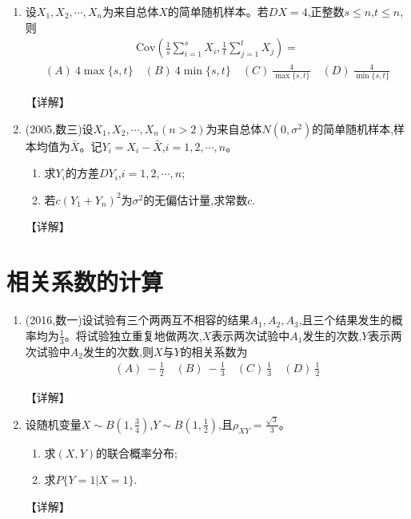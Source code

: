 \documentclass[12pt, a4paper, oneside, UTF8]{ctexbook}
\begin{document}
\begin{enumerate}[label=\arabic*.,start=11]
    \item  设$X_1,X_2,\cdots,X_n$为来自总体$X$的简单随机样本。若$DX=4$,正整数$s\leq n$,$t\leq n$,则
    \begin{align*}
        \text{Cov}\left(\frac{1}{s}\sum_{i=1}^s X_i,\frac{1}{t}\sum_{j=1}^t X_j\right)=
    \end{align*}
    \begin{align*}
        (A)\ 4\max\{s,t\} \quad (B)\ 4\min\{s,t\} \quad (C)\ \frac{4}{\max\{s,t\}} \quad (D)\ \frac{4}{\min\{s,t\}}
    \end{align*}
    
    \begin{solution}
    【详解】
    \end{solution}
    
    \item  (2005,数三)设$X_1,X_2,\cdots,X_n(n>2)$为来自总体$N(0,\sigma^2)$的简单随机样本,样本均值为$\bar{X}$。记$Y_i=X_i-\bar{X}$,$i=1,2,\cdots,n$。
    \begin{enumerate}
        \item 求$Y_i$的方差$DY_i$,$i=1,2,\cdots,n$;
        \item 若$c(Y_1+Y_n)^2$为$\sigma^2$的无偏估计量,求常数$c$.
    \end{enumerate}
    
    \begin{solution}
    【详解】
    \end{solution}
\end{enumerate}

\section{相关系数的计算}

\begin{enumerate}[label=\arabic*.,start=13]
    \item  (2016,数一)设试验有三个两两互不相容的结果$A_1,A_2,A_3$,且三个结果发生的概率均为$\frac{1}{3}$。将试验独立重复地做两次,$X$表示两次试验中$A_1$发生的次数,$Y$表示两次试验中$A_2$发生的次数,则$X$与$Y$的相关系数为
    \begin{align*}
        (A)\ -\frac{1}{2} \quad (B)\ -\frac{1}{3} \quad (C)\ \frac{1}{3} \quad (D)\ \frac{1}{2}
    \end{align*}
    
    \begin{solution}
    【详解】
    \end{solution}
    
    \item  设随机变量$X\sim B\left(1,\frac{3}{4}\right)$,$Y\sim B\left(1,\frac{1}{2}\right)$,且$\rho_{XY}=\frac{\sqrt{3}}{3}$。
    \begin{enumerate}
        \item 求$(X,Y)$的联合概率分布;
        \item 求$P\{Y=1|X=1\}$.
    \end{enumerate}
    
    \begin{solution}
    【详解】
    \end{solution}
\end{enumerate}
\end{document}
